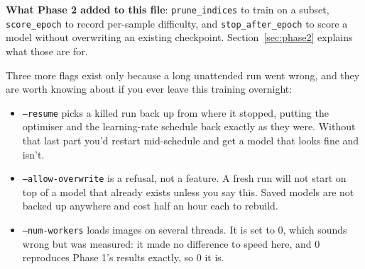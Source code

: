 \documentclass[11pt]{article}
\newcommand{\code}[1]{\texttt{\small #1}}
\begin{document}
\begin{center}
\end{center}

\textbf{What Phase 2 added to this file}: \code{prune\_indices} to train on a
subset, \code{score\_epoch} to record per-sample difficulty, and
\code{stop\_after\_epoch} to score a model without overwriting an existing
checkpoint. Section~\ref{sec:phase2} explains what those are for.

Three more flags exist only because a long unattended run went wrong, and they
are worth knowing about if you ever leave this training overnight:

\begin{itemize}[leftmargin=1.4em]
\item \code{--resume} picks a killed run back up from where it stopped, putting
the optimiser and the learning-rate schedule back exactly as they were. Without
that last part you'd restart mid-schedule and get a model that looks fine and
isn't.
\item \code{--allow-overwrite} is a refusal, not a feature. A fresh run will not
start on top of a model that already exists unless you say this. Saved models
are not backed up anywhere and cost half an hour each to rebuild.
\item \code{--num-workers} loads images on several threads. It is set to 0,
which sounds wrong but was measured: it made no difference to speed here, and 0
reproduces Phase 1's results exactly, so 0 it is.
\end{itemize}
\end{document}
